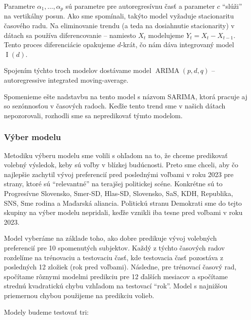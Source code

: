 \documentclass[main.tex]{subfiles}
\begin{document}
Parametre $\alpha_1,\dots,\alpha_p$ sú parametre pre autoregresívnu časť a parameter $c$ \enquote{slúži} na vertikálny posun. Ako sme spomínali, takýto model vyžaduje stacionaritu časového radu. Na eliminovanie trendu (a teda na dosiahnutie stacionarity) v dátach sa používa diferencovanie -- namiesto $X_t$ modelujeme $Y_t = X_t - X_{t-1}$. Tento proces diferenciácie opakujeme $d$-krát, čo nám dáva integrovaný model $\operatorname{I}(d)$. 

Spojením týchto troch modelov dostávame model $\operatorname{ARIMA}(p,d,q)$ -- autoregressive integrated moving-average.

Spomenieme ešte nadstavbu na tento model s názvom SARIMA, ktorá pracuje aj so sezónnosťou v časových radoch. Keďže tento trend sme v našich dátach nepozorovali, rozhodli sme sa nepredikovať týmto modelom. 

\subsubsection{Výber modelu}

Metodiku výberu modelu sme volili s ohľadom na to, že chceme predikovať volebný výsledok, keby sú voľby v blízkej budúcnosti. Preto sme chceli, aby čo najlepšie zachytil vývoj preferencií pred poslednými voľbami v roku 2023 pre strany, ktoré sú \enquote{relevantné} na terajšej politickej scéne. Konkrétne sú to Progresívne Slovensko, Smer-SD, Hlas-SD, Slovensko, SaS, KDH, Republika, SNS, Sme rodina a Maďarská aliancia. Politickú stranu Demokrati sme do tejto skupiny na výber modelu nepridali, keďže vznikli iba tesne pred voľbami v roku 2023. 

Model vyberáme na základe toho, ako dobre predikuje vývoj volebných preferencií pre 10 spomenutých subjektov. Každý z týchto časových radov rozdelíme na trénovaciu a testovaciu časť, kde testovacia časť pozostáva z posledných 12 zložiek (rok pred voľbami). Následne, pre trénovací časový rad, spočítame rôznymi modelmi predikciu pre 12 ďalších mesiacov a spočítame strednú kvadratickú chybu vzhľadom na testovací \enquote{rok}. Model s najnižšou priemernou chybou použijeme na predikciu volieb. 

\newpage

Modely budeme testovať tri:
\end{document}
